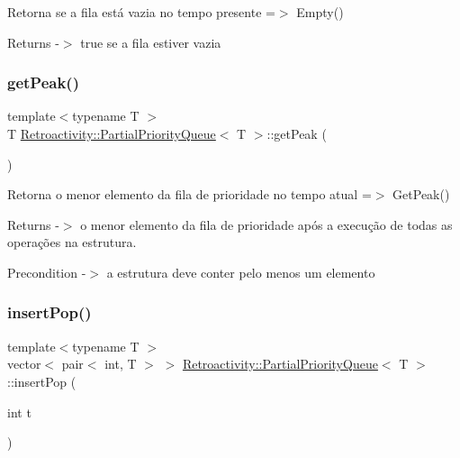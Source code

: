 Retorna se a fila está vazia no tempo presente =$>$ Empty()

\begin{DoxyReturn}{Returns}
-\/$>$ \textquotesingle{}true\textquotesingle{} se a fila estiver vazia 
\end{DoxyReturn}
\mbox{\label{classRetroactivity_1_1PartialPriorityQueue_a354d975ff01dea8ea138294efb961fc9}} 
\subsubsection{\texorpdfstring{get\+Peak()}{getPeak()}}
{\footnotesize\ttfamily template$<$typename T $>$ \\
T \hyperlink{classRetroactivity_1_1PartialPriorityQueue}{Retroactivity\+::\+Partial\+Priority\+Queue}$<$ T $>$\+::get\+Peak (\begin{DoxyParamCaption}{ }\end{DoxyParamCaption})}

Retorna o menor elemento da fila de prioridade no tempo atual =$>$ Get\+Peak()

\begin{DoxyReturn}{Returns}
-\/$>$ o menor elemento da fila de prioridade após a execução de todas as operações na estrutura. 
\end{DoxyReturn}
\begin{DoxyPrecond}{Precondition}
-\/$>$ a estrutura deve conter pelo menos um elemento 
\end{DoxyPrecond}
\mbox{\label{classRetroactivity_1_1PartialPriorityQueue_a4e66874ab3f2b88c5d45dc50acf09386}} 
\subsubsection{\texorpdfstring{insert\+Pop()}{insertPop()}}
{\footnotesize\ttfamily template$<$typename T $>$ \\
vector$<$ pair$<$ int, T $>$ $>$ \hyperlink{classRetroactivity_1_1PartialPriorityQueue}{Retroactivity\+::\+Partial\+Priority\+Queue}$<$ T $>$\+::insert\+Pop (\begin{DoxyParamCaption}\item[{int}]{t }\end{DoxyParamCaption})}


